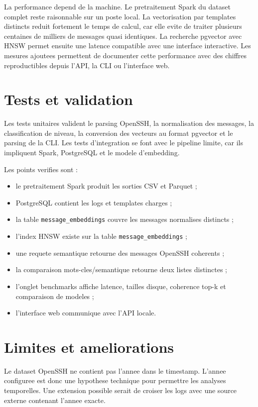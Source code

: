 \documentclass[12pt,a4paper]{article}
\begin{document}
La performance depend de la machine. Le pretraitement Spark du dataset complet reste raisonnable sur
un poste local. La vectorisation par templates distincts reduit fortement le temps de calcul, car
elle evite de traiter plusieurs centaines de milliers de messages quasi identiques. La recherche
pgvector avec HNSW permet ensuite une latence compatible avec une interface interactive.
Les mesures ajoutees permettent de documenter cette performance avec des chiffres reproductibles
depuis l'API, la CLI ou l'interface web.

\section{Tests et validation}

Les tests unitaires valident le parsing OpenSSH, la normalisation des messages, la classification de
niveau, la conversion des vecteurs au format pgvector et le parsing de la CLI. Les tests
d'integration se font avec le pipeline limite, car ils impliquent Spark, PostgreSQL et le modele
d'embedding.

Les points verifies sont :

\begin{itemize}
  \item le pretraitement Spark produit les sorties CSV et Parquet ;
  \item PostgreSQL contient les logs et templates charges ;
  \item la table \texttt{message\_embeddings} couvre les messages normalises distincts ;
  \item l'index HNSW existe sur la table \texttt{message\_embeddings} ;
  \item une requete semantique retourne des messages OpenSSH coherents ;
  \item la comparaison mots-cles/semantique retourne deux listes distinctes ;
  \item l'onglet benchmarks affiche latence, tailles disque, coherence top-k et comparaison de modeles ;
  \item l'interface web communique avec l'API locale.
\end{itemize}

\section{Limites et ameliorations}

Le dataset OpenSSH ne contient pas l'annee dans le timestamp. L'annee configuree est donc une
hypothese technique pour permettre les analyses temporelles. Une extension possible serait de
croiser les logs avec une source externe contenant l'annee exacte.
\end{document}
